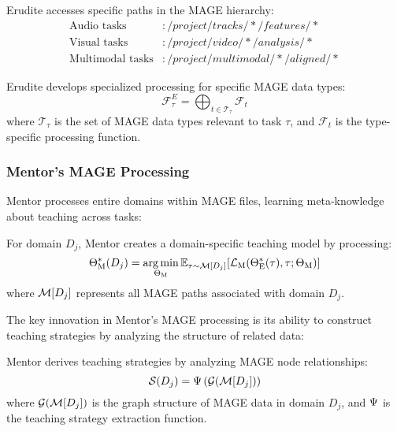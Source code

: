 Erudite accesses specific paths in the MAGE hierarchy:
\begin{align}
\text{Audio tasks} &: /project/tracks/*/features/* \\
\text{Visual tasks} &: /project/video/*/analysis/* \\
\text{Multimodal tasks} &: /project/multimodal/*/aligned/*
\end{align}

\begin{proposition}
Erudite develops specialized processing for specific MAGE data types:
\begin{equation}
\mathcal{F}_{\tau}^E = \bigoplus_{t \in \mathcal{T}_{\tau}} \mathcal{F}_t
\end{equation}
where $\mathcal{T}_{\tau}$ is the set of MAGE data types relevant to task $\tau$, and $\mathcal{F}_t$ is the type-specific processing function.
\end{proposition}

\subsubsection{Mentor's MAGE Processing}

Mentor processes entire domains within MAGE files, learning meta-knowledge about teaching across tasks:

\begin{theorem}
For domain $D_j$, Mentor creates a domain-specific teaching model by processing:
\begin{equation}
\Theta_{\text{M}}^{*}(D_j) = \mathop{\mathrm{arg\,min}}_{\Theta_{\text{M}}} \mathbb{E}_{\tau \sim \mathcal{M}[D_j]} [\mathcal{L}_{\text{M}}(\Theta_{\text{E}}^{*}(\tau), \tau; \Theta_{\text{M}})]
\end{equation}
where $\mathcal{M}[D_j]$ represents all MAGE paths associated with domain $D_j$.
\end{theorem}

The key innovation in Mentor's MAGE processing is its ability to construct teaching strategies by analyzing the structure of related data:

\begin{proposition}
Mentor derives teaching strategies by analyzing MAGE node relationships:
\begin{equation}
\mathcal{S}(D_j) = \Psi\left(\mathcal{G}(\mathcal{M}[D_j])\right)
\end{equation}
where $\mathcal{G}(\mathcal{M}[D_j])$ is the graph structure of MAGE data in domain $D_j$, and $\Psi$ is the teaching strategy extraction function.
\end{proposition}

